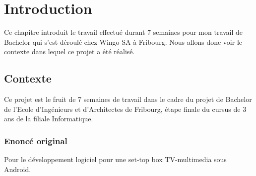 \documentclass[a4paper, 12pt, svgnames]{report}
\begin{document}
\let\origdoublepage\cleardoublepage
\newcommand{\clearemptydoublepage}{%
 \clearpage
 {\pagestyle{empty}\origdoublepage}%
}
\let\cleardoublepage\clearemptydoublepage

	
	
	
	
	\setlength{\parindent}{0in}

	\pagestyle{empty}
	
	\cleardoublepage
	\pagestyle{empty}

	\setcounter{page}{1}
	\cleardoublepage
	\pagestyle{empty}
	\setcounter{page}{1}
	\pagebreak

	\pagestyle{fancy}
	\renewcommand{\chaptermark}[1]{\markboth{#1}{}}
	\rhead{}
	
	\renewcommand{\thepage}{\roman{page}}
	
	\cleardoublepage
	\setcounter{page}{1}
	\tableofcontents
	\clearpage
	
	\makeatletter
	   \let\ps@plain\ps@fancy
	\makeatother
	\pagestyle{fancy}
	\renewcommand{\headrulewidth}{0.3pt}
	\renewcommand{\footrulewidth}{0.3pt}
	\renewcommand{\thepage}{\arabic{page}}
	
	
	\cleardoublepage
	\setcounter{page}{1}
	
	
	\lhead{\authornameone}
	\rhead{\today}
	\chead{\modulename}
	
	\lfoot{\subjectName}
	\rfoot{Page \thepage\ - \pageref{LastPage}}
	\cfoot{}
	\chapter{Introduction}
	Ce chapitre introduit le travail effectué durant 7 semaines pour mon travail de Bachelor qui s'est déroulé chez Wingo SA à Fribourg. Nous allons donc voir le contexte dans lequel ce projet a été réalisé.
	\section{Contexte}
	Ce projet est le fruit de 7 semaines de travail dans le cadre du projet de Bachelor de l'Ecole d'Ingénieurs et d'Architectes de Fribourg, étape finale du cursus de 3 ans de la filiale Informatique.
	\subsection{Enoncé original}
	Pour le développement logiciel pour une set-top box TV-multimedia sous Android.
	
\end{document}
